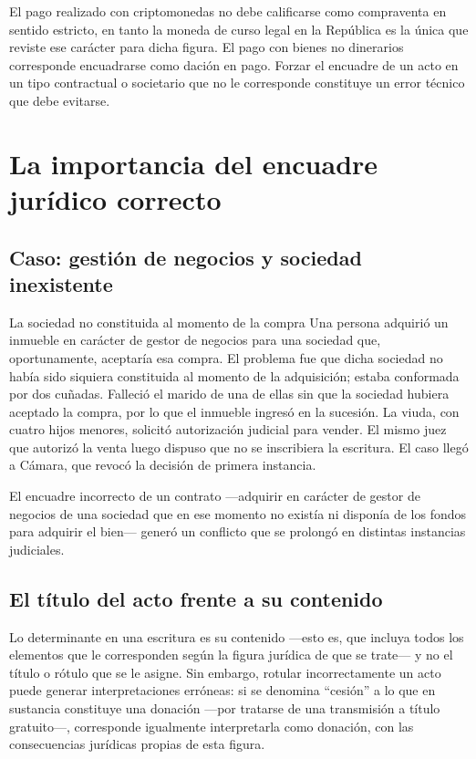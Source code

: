 \documentclass[12pt,oneside]{book}
\begin{document}
\begin{important}
El pago realizado con criptomonedas no debe calificarse como compraventa en sentido estricto, en tanto la moneda de curso legal en la República es la única que reviste ese carácter para dicha figura. El pago con bienes no dinerarios corresponde encuadrarse como dación en pago. Forzar el encuadre de un acto en un tipo contractual o societario que no le corresponde constituye un error técnico que debe evitarse.
\end{important}

\section{La importancia del encuadre jurídico correcto}

\subsection{Caso: gestión de negocios y sociedad inexistente}

\begin{example}{La sociedad no constituida al momento de la compra}
Una persona adquirió un inmueble en carácter de gestor de negocios para una sociedad que, oportunamente, aceptaría esa compra. El problema fue que dicha sociedad no había sido siquiera constituida al momento de la adquisición; estaba conformada por dos cuñadas. Falleció el marido de una de ellas sin que la sociedad hubiera aceptado la compra, por lo que el inmueble ingresó en la sucesión. La viuda, con cuatro hijos menores, solicitó autorización judicial para vender. El mismo juez que autorizó la venta luego dispuso que no se inscribiera la escritura. El caso llegó a Cámara, que revocó la decisión de primera instancia.
\end{example}

El encuadre incorrecto de un contrato —adquirir en carácter de gestor de negocios de una sociedad que en ese momento no existía ni disponía de los fondos para adquirir el bien— generó un conflicto que se prolongó en distintas instancias judiciales.

\subsection{El título del acto frente a su contenido}

\begin{important}
Lo determinante en una escritura es su contenido —esto es, que incluya todos los elementos que le corresponden según la figura jurídica de que se trate— y no el título o rótulo que se le asigne. Sin embargo, rotular incorrectamente un acto puede generar interpretaciones erróneas: si se denomina ``cesión'' a lo que en sustancia constituye una donación —por tratarse de una transmisión a título gratuito—, corresponde igualmente interpretarla como donación, con las consecuencias jurídicas propias de esta figura.
\end{important}
\end{document}
